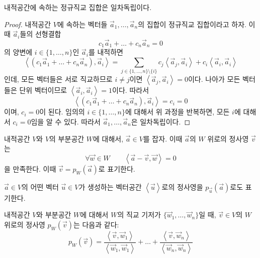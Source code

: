 \documentclass[sections/engineering_mathematics_lecture_note.tex]{subfiles}
\begin{document}
\begin{theorem}
    내적공간에 속하는 정규직교 집합은 일차독립이다.
\end{theorem}

\begin{proof}
    내적공간 $V$에 속하는 벡터들 $\vec a_1, \dots, \vec a_n$의 집합이 정규직교 집합이라고 하자.
    이때 $\vec a_i$들의 선형결합
    \begin{equation*}
        c_1 \vec a_1 + \dots + c_n \vec a_n = 0
    \end{equation*}
    의 양변에 $i \in \{1, \dots, n\}$인 $\vec a_i$를 내적하면
    \begin{equation*}
        \left<(c_1 \vec a_1 + \dots + c_n \vec a_n), \vec a_i\right> = \sum_{j \in \{1, \dots, n\} \setminus \{i\}} c_j \left<\vec a_j, \vec a_i\right> + c_i \left<\vec a_i, \vec a_i\right>
    \end{equation*}
    인데, 모든 벡터들은 서로 직교하므로 $i \neq j$이면 $\left<\vec a_j, \vec a_i\right> = 0$이다.
    나아가 모든 벡터들은 단위 벡터이므로 $\left<\vec a_i, \vec a_i\right> = 1$이다.
    따라서
    \begin{equation*}
        \left<(c_1 \vec a_1 + \dots + c_n \vec a_n), \vec a_i\right> = c_i = 0
    \end{equation*}
    이며, $c_i = 0$이 된다.
    임의의 $i \in \{1, \dots, n\}$에 대해서 위 과정을 반복하면, 모든 $i$에 대해서 $c_i = 0$임을 알 수 있다.
    따라서 $\vec a_1, \dots, \vec a_n$은 일차독립이다.
\end{proof}

\begin{definition}
    내적공간 $V$와 $V$의 부분공간 $W$에 대해서, $\vec a \in V$를 잡자.
    이때 $\vec a$의 $W$ 위로의 정사영 $\vec v$는 
    \begin{equation*}
        \forall \vec w \in W \qquad \left<\vec a - \vec v, \vec w\right> = 0
    \end{equation*}
    을 만족한다.
    이때 $\vec v = p_W (\vec a)$로 표기한다.

    $\vec a \in V$의 어떤 벡터 $\vec u \in V$가 생성하는 벡터공간 $\left<\vec u\right>$로의 정사영을 $p_{\vec u} (\vec a)$로도 표기한다.
\end{definition}

\begin{theorem}
    내적공간 $V$와 부분공간 $W$에 대해서 $W$의 직교 기저가 $\{\vec w_1, \dots, \vec w_n\}$일 때, $\vec v \in V$의 $W$ 위로의 정사영 $p_W (\vec v)$는 다음과 같다:
    \begin{equation*}
        p_W (\vec v) = \frac{\left<\vec v, \vec w_1\right>}{\left<\vec w_1, \vec w_1\right>} + \dots + \frac{\left<\vec v, \vec w_n\right>}{\left<\vec w_n, \vec w_n\right>}
    \end{equation*}
\end{theorem}
\end{document}
